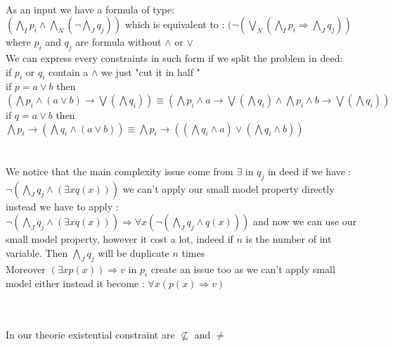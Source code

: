 \\As an input we have a formula of type:
\\ $(\underset{I}{\bigwedge}p_{i} \wedge \underset{N}{\bigwedge}(\neg\underset{J}{\bigwedge}q_{j}))$
which is equivalent to : $(\neg(\underset{N}{\bigvee}(\underset{I}{\bigwedge}p_{i}\Rightarrow\underset{J}{\bigwedge}q_{j}))$
\\where $p_{i}$ and $q_{j}$ are formula without $\wedge$ or $\vee$
\\ We can express every constraints in such form if we split the problem in deed:
\\ if $p_{i}$ or $q_{i}$ contain a $\wedge$ we just "cut it in half "
\\ if $p = a \vee b$ then $(\bigwedge p_{i} \wedge (a\vee b) \rightarrow \bigvee(\bigwedge q_{i})) \equiv (\bigwedge p_{i} \wedge a \rightarrow \bigvee(\bigwedge q_{i}) \wedge \bigwedge p_{i} \wedge b \rightarrow \bigvee(\bigwedge q_{i}))$
\\ if $q = a \vee b$ then $\bigwedge p_{i} \rightarrow (\bigwedge q_{i} \wedge (a \vee b)) \equiv \bigwedge p_{i} \rightarrow ((\bigwedge q_{i} \wedge a) \vee (\bigwedge q_{i} \wedge b))$
\\
\\
\\ We notice that the main complexity issue come from $\exists$ in $q_{j}$ in deed if we have :
$\neg(\underset{J}{\bigwedge}q_{j} \wedge (\exists x q(x)))$ we can't apply our small model property directly
instead we have to apply : $\neg(\underset{J}{\bigwedge}q_{j} \wedge (\exists x q(x))) \Rightarrow \forall x (\neg(\underset{J}{\bigwedge}q_{j} \wedge q(x)))$
and now we can use our small model property, however it cost a lot, indeed if $n$ is the number of int variable.
Then $\underset{J}{\bigwedge}q_{j}$ will be duplicate $n$ times
\\ Moreover $(\exists x p(x)) \Rightarrow v$ in $p_{i}$ create an issue too as we can't apply small model either
instead it become :  $\forall x (p(x) \Rightarrow v)$

\\
\\ In our theorie existential constraint are $\nsubseteq$ and $\neq$

